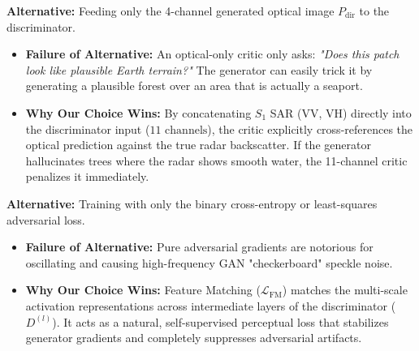 \documentclass[11pt,a4paper]{article}
\begin{document}
\begin{tcolorbox}[colback=white,colframe=secondary,title=\textbf{2. Why an 11-Channel Multi-Modal Discriminator over an Optical-Only Discriminator?}]
\textbf{Alternative:} Feeding only the 4-channel generated optical image $P_{\text{dir}}$ to the discriminator.
\begin{itemize}[leftmargin=1.2em, itemsep=0.2em]
    \item \textbf{Failure of Alternative:} An optical-only critic only asks: \textit{"Does this patch look like plausible Earth terrain?"} The generator can easily trick it by generating a plausible forest over an area that is actually a seaport.
    \item \textbf{Why Our Choice Wins:} By concatenating $S_1$ SAR (VV, VH) directly into the discriminator input ($11\text{ channels}$), the critic explicitly cross-references the optical prediction against the true radar backscatter. If the generator hallucinates trees where the radar shows smooth water, the 11-channel critic penalizes it immediately.
\end{itemize}
\end{tcolorbox}

\begin{tcolorbox}[colback=white,colframe=primary,title=\textbf{3. Why Feature Matching Loss ($\mathcal{L}_{\text{FM}}$) over Pure Adversarial Loss Alone?}]
\textbf{Alternative:} Training with only the binary cross-entropy or least-squares adversarial loss.
\begin{itemize}[leftmargin=1.2em, itemsep=0.2em]
    \item \textbf{Failure of Alternative:} Pure adversarial gradients are notorious for oscillating and causing high-frequency GAN "checkerboard" speckle noise.
    \item \textbf{Why Our Choice Wins:} Feature Matching ($\mathcal{L}_{\text{FM}}$) matches the multi-scale activation representations across intermediate layers of the discriminator ($D^{(l)}$). It acts as a natural, self-supervised perceptual loss that stabilizes generator gradients and completely suppresses adversarial artifacts.
\end{itemize}
\end{tcolorbox}
\end{document}
